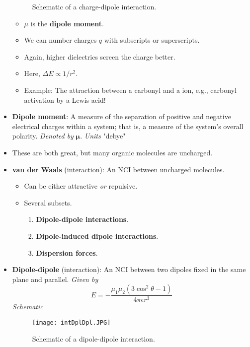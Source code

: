 \documentclass[../notes.tex]{subfiles}
\begin{document}
\begin{itemize}
\begin{figure}[h!]
        \caption{Schematic of a charge-dipole interaction.}
        \label{fig:intCrgDpl}
    \end{figure}
    \begin{itemize}
        \item $\mu$ is the \textbf{dipole moment}.
        \item We can number charges $q$ with subscripts or superscripts.
        \item Again, higher dielectrics screen the charge better.
        \item Here, $\Delta E\propto 1/r^2$.
        \item Example: The attraction between a carbonyl and a  ion, e.g., carbonyl activation by a Lewis acid!
    \end{itemize}
    \item \textbf{Dipole moment}: A measure of the separation of positive and negative electrical charges within a system; that is, a measure of the system's overall polarity. \emph{Denoted by} $\bm{\mu}$. \emph{Units} \si{\debye} "debye"
    \item These are both great, but many organic molecules are uncharged.
    \item \textbf{van der Waals} (interaction): An NCI between uncharged molecules.
    \begin{itemize}
        \item Can be either attractive \emph{or} repulsive.
        \item Several subsets.
        \begin{enumerate}[label={\Roman*.)}]
            \item \textbf{Dipole-dipole interactions}.
            \item \textbf{Dipole-induced dipole interactions}.
            \item \textbf{Dispersion forces}.
        \end{enumerate}
    \end{itemize}
    \item \textbf{Dipole-dipole} (interaction): An NCI between two dipoles fixed in the same plane and parallel. \emph{Given by}
    \begin{equation*}
        E = -\frac{\mu_1\mu_2(3\cos^2\theta-1)}{4\pi\epsilon r^3}
    \end{equation*}
    \emph{Schematic}
    \begin{figure}[h!]
        \centering
        \texttt{[image: intDplDpl.JPG]}
        \caption{Schematic of a dipole-dipole interaction.}

\end{figure}
\end{itemize}
\end{document}
